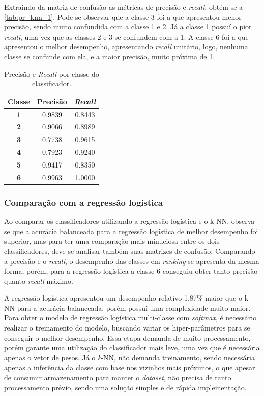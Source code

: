 Extraindo da matriz de confusão as métricas de precisão e \textit{recall}, obtém-se a \autoref{tab:pr_knn_1}. Pode-se observar que a classe 3 foi a que apresentou menor precisão, sendo muito confundida com a classe 1 e 2. Já a classe 1 possuí o pior \textit{recall}, uma vez que as classes 2 e 3 se confundem com a 1. A classe 6 foi a que apresentou o melhor desempenho, apresentando \textit{recall} unitário, logo, nenhuma classe se confunde com ela, e a maior precisão, muito próxima de 1.


\begin{table}[H]
	\centering
	\begin{tabular}{c|c|c}
		\textbf{Classe} & \textbf{Precisão} & \textbf{\textit{Recall}} \\ \hline
		\textbf{1}      & 0.9839 & 0.8443 \\
		\textbf{2}      & 0.9066 & 0.8989 \\
		\textbf{3}      & 0.7738 & 0.9615 \\
		\textbf{4}      & 0.7923 & 0.9240 \\
		\textbf{5}      & 0.9417 & 0.8350 \\
		\textbf{6}      & 0.9963 & 1.0000
	\end{tabular}
	\caption{Precisão e \textit{Recall} por classe do classificador.}
	\label{tab:pr_knn_1}
\end{table}

\subsubsection*{Comparação com a regressão logística}

Ao comparar os classificadores utilizando a regressão logística e o k-NN, observa-se que a acurácia balanceada para a regressão logística de melhor desempenho foi superior, mas para ter uma comparação mais minuciosa entre os dois classificadores, deve-se analisar também suas matrizes de confusão. Comparando a precisão e o \textit{recall}, o desempenho das classes em \textit{ranking} se apresenta da mesma forma, porém, para a regressão logística a classe 6 conseguiu obter tanto precisão quanto \textit{recall} máximo.

A regressão logística apresentou um desempenho relativo 1,87\% maior que o k-NN para a acurácia balanceada, porém possuí uma complexidade muito maior. Para obter o modelo de regressão logística multi-classe com \textit{softmax}, é necessário realizar o treinamento do modelo, buscando variar os hiper-parâmetros para se conseguir o melhor desempenho. Essa etapa demanda de muito processamento, porém garante uma utilização do classificador mais leve, uma vez que é necessária apenas o vetor de pesos. Já o \textit{k}-NN, não demanda treinamento, sendo necessária apenas a inferência da classe com base nos vizinhos mais próximos, o que apesar de consumir armazenamento para manter o \textit{dataset}, não precisa de tanto processamento prévio, sendo uma solução simples e de rápida implementação. 

